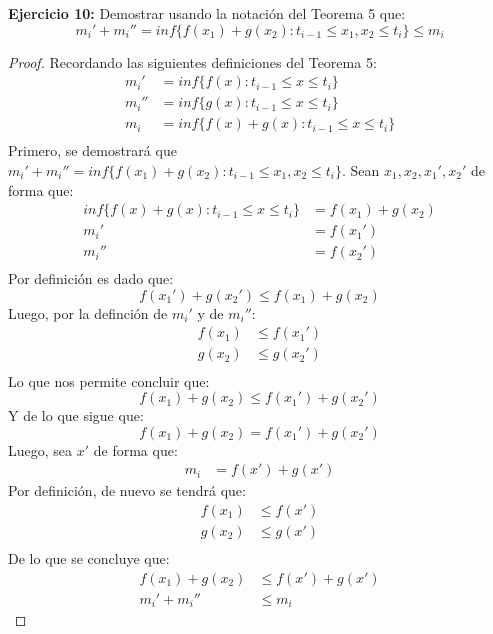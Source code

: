 \documentclass[../../main.tex]{subfiles}
\begin{document}
\question \textbf{Ejercicio 10:} Demostrar usando la notación del Teorema 5 que:
$$m_i' + m_i'' = inf\{f(x_1) + g(x_2): t_{i-1} \le x_1, x_2 \le t_i\} \le m_i$$
\begin{proof}
    Recordando las siguientes definiciones del Teorema 5:
    \begin{align*}
        m_i' &= inf\{f(x): t_{i-1} \le x \le t_i\}\\
        m_i'' &= inf\{g(x): t_{i-1} \le x \le t_i\}\\
        m_i &= inf\{f(x)+g(x): t_{i-1} \le x \le t_i\}\\
    \end{align*}
    Primero, se demostrará que $m_i' + m_i'' = inf\{f(x_1) + g(x_2): t_{i-1} \le x_1, x_2 \le t_i\}$. Sean $x_1, x_2, x_1', x_2'$ de forma que:
    \begin{align*}
        inf\{f(x)+g(x): t_{i-1} \le x \le t_i\} &= f(x_1) + g(x_2)\\
        m_i' &= f(x_1')\\
        m_i'' &= f(x_2')\\
    \end{align*}
    Por definición es dado que:
    $$f(x_1') + g(x_2') \le f(x_1) + g(x_2)$$
    Luego, por la definción de $m_i'$ y de $m_i''$:
    \begin{align*}
        f(x_1) &\le f(x_1')\\
        g(x_2) &\le g(x_2')\\
    \end{align*}
    Lo que nos permite concluir que:
    $$f(x_1) + g(x_2) \le f(x_1') + g(x_2')$$
    Y de lo que sigue que:
    $$f(x_1) + g(x_2) = f(x_1') + g(x_2')$$
    Luego, sea $x'$ de forma que:
    \begin{align*}
        m_i &= f(x') + g(x')
    \end{align*}
    Por definición, de nuevo se tendrá que:
    \begin{align*}
        f(x_1) &\le f(x')\\
        g(x_2) &\le g(x')\\
    \end{align*}
    De lo que se concluye que:
    \begin{align*}
        f(x_1) + g(x_2) &\le f(x') + g(x')\\
        m_i' + m_i'' &\le m_i
    \end{align*}
\end{proof}
\end{document}

